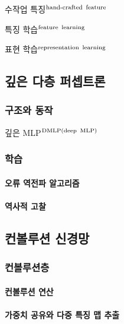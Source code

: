 \documentclass [12pt] {oblivoir}
\let\oldsubsubsection=\subsubsection
\renewcommand{\subsubsection}
{
  \filbreak
  \oldsubsubsection
}
\begin{document}
수작업 특징$^{\text{hand-crafted\, feature}}$

특징 학습$^{\text{feature\, learning}}$

표현 학습$^{\text{representation\, learning}}$

\subsection{깊은 다층 퍼셉트론}

\subsubsection{구조와 동작}

깊은 MLP$^{\text{DMLP(deep\, MLP)}}$

\subsubsection{학습}

\paragraph*{오류 역전파 알고리즘}\mbox{}

\vspace{3mm}

\paragraph*{역사적 고찰}\mbox{}

\vspace{3mm}

\subsection{컨볼루션 신경망}

\subsubsection{컨볼루션층}

\paragraph*{컨볼루션 연산}\mbox{}

\vspace{3mm}

\paragraph*{가중치 공유와 다중 특징 맵 추출}\mbox{}
\end{document}
